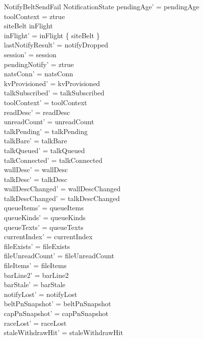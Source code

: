 \documentclass[a4paper,10pt,fleqn]{article}
\begin{document}
\begin{schema}{NotifyBeltSendFail}
  \Delta NotificationState
  \where
  pendingAge' = pendingAge \\
  toolContext = ztrue \\
  siteBelt \in inFlight \\
  inFlight' = inFlight \setminus \{ siteBelt \} \\
  lastNotifyResult' = notifyDropped \\
  session' = session \\
  pendingNotify' = ztrue \\
  natsConn' = natsConn \\
  kvProvisioned' = kvProvisioned \\
  talkSubscribed' = talkSubscribed \\
  toolContext' = toolContext \\
  readDesc' = readDesc \\
  unreadCount' = unreadCount \\
  talkPending' = talkPending \\
  talkBare' = talkBare \\
  talkQueued' = talkQueued \\
  talkConnected' = talkConnected \\
  wallDesc' = wallDesc \\
  talkDesc' = talkDesc \\
  wallDescChanged' = wallDescChanged \\
  talkDescChanged' = talkDescChanged \\
  queueItems' = queueItems \\
  queueKinds' = queueKinds \\
  queueTexts' = queueTexts \\
  currentIndex' = currentIndex \\
  fileExists' = fileExists \\
  fileUnreadCount' = fileUnreadCount \\
  fileItems' = fileItems \\
  barLine2' = barLine2 \\
  barStale' = barStale \\
  notifyLost' = notifyLost \\
  beltPnSnapshot' = beltPnSnapshot \\
  capPnSnapshot' = capPnSnapshot \\
  raceLost' = raceLost \\
  staleWithdrawHit' = staleWithdrawHit \\

\end{schema}
\end{document}
